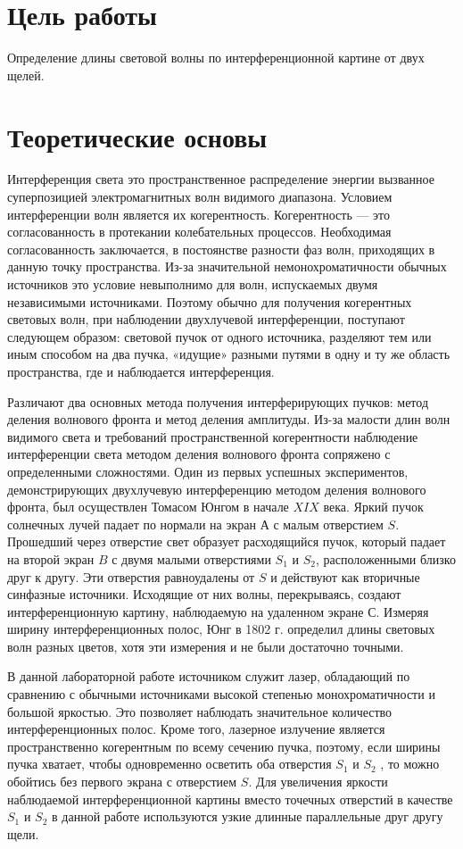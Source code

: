 \documentclass[12pt]{article}
\begin{document}
    \section*{Цель работы}

    Определение длины световой волны по интерференционной картине от двух щелей.

    \section*{Теоретические основы}

    Интерференция света это пространственное распределение энергии вызванное суперпозицией электромагнитных волн видимого диапазона. Условием интерференции волн является их когерентность. Когерентность --- это согласованность в протекании колебательных процессов. Необходимая согласованность заключается, в постоянстве разности фаз волн, приходящих в данную точку пространства. Из-за значительной немонохроматичности обычных источников это условие невыполнимо для волн, испускаемых двумя независимыми источниками. Поэтому обычно для получения когерентных световых волн, при наблюдении двухлучевой интерференции, поступают следующем образом: световой пучок от одного источника, разделяют тем или иным способом на два пучка, «идущие» разными путями в одну и ту же область пространства, где и наблюдается интерференция.

    Различают два основных метода получения интерферирующих пучков: метод деления волнового фронта и метод деления амплитуды. Из-за малости длин волн видимого света и требований пространственной когерентности наблюдение интерференции света методом деления волнового фронта сопряжено с определенными сложностями. Один из первых успешных экспериментов, демонстрирующих двухлучевую интерференцию методом деления волнового фронта, был осуществлен Томасом Юнгом в начале $ XIX $ века. Яркий пучок солнечных лучей падает по нормали на экран $ А $ с малым отверстием $ S $. Прошедший через отверстие свет образует расходящийся пучок, который падает на второй экран $ B $ с двумя малыми отверстиями $ S_1 $ и $ S_2 $, расположенными близко друг к другу. Эти отверстия равноудалены от $ S $ и действуют как вторичные синфазные источники. Исходящие от них волны, перекрываясь, создают интерференционную картину, наблюдаемую на удаленном экране $ С $. Измеряя ширину интерференционных полос, Юнг в 1802 г. определил длины световых волн разных цветов, хотя эти измерения и не были достаточно точными.

    В данной лабораторной работе источником служит лазер, обладающий по сравнению с обычными источниками высокой степенью монохроматичности и большой яркостью. Это позволяет наблюдать значительное количество интерференционных полос. Кроме того, лазерное излучение является пространственно когерентным по всему сечению пучка, поэтому, если ширины пучка хватает, чтобы одновременно осветить оба отверстия $ S_1 $ и $ S_2 $ , то можно обойтись без первого экрана с отверстием $ S $. Для увеличения яркости наблюдаемой интерференционной картины вместо точечных отверстий в качестве $ S_1 $ и $ S_2 $ в данной работе используются узкие длинные параллельные друг другу щели.
\end{document}

